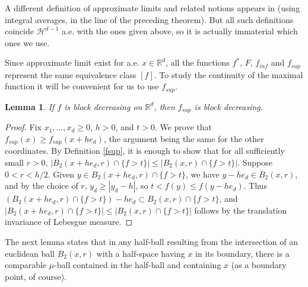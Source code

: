 \documentclass[12pt]{amsart}
\numberwithin{equation}{section}
\theoremstyle{plain}
\newtheorem{lemma}[theorem]{Lemma}
\theoremstyle{definition}
\theoremstyle{remark}
\begin{document}
A different  definition of approximate limits
and related notions appears
in \cite{AFP} (using integral averages, in the line of
the preceding theorem).
But all such definitions coincide
 $\mathcal{H}^{d-1}$ a.e. with the ones given above, so it is actually
 immaterial which ones we use.

Since approximate limit exist for a.e. $x\in
\mathbb{R}^d$,  all the functions $f^*$, $F$, $f_{inf}$ and
$f_{sup}$ represent the same equivalence class $[f]$. To study  the continuity of the maximal function it will be convenient for us to use
$f_{sup}$.

\begin{lemma}
  If $f$ is block decreasing on $\mathbb{R}^d$, then
  $f_{sup}$ is block decreasing.
\end{lemma}

\begin{proof}
 Fix $x_1,\ldots,x_d\ge 0$, $h>0$, and $t > 0$. We  prove that $f_{sup}(x)\ge
  f_{sup}(x+he_d)$, the argument being the same for the other coordinates.
  By Definition \ref{fsup}, it is enough to show that for all sufficiently
  small $r >0$, $|B_2(x+he_d,r)\cap\{f>t\}|\le| B_2(x,r)\cap\{f>t\}|$.
Suppose $0<r<h/2$. Given
$y\in B_2(x+he_d,r)\cap\{f>t\}$, we have $y - h e_d \in B_2(x,r)$, and by the choice of $r$,
$y_d\ge |y_d-h|$, so $t < f(y)\le f(y-he_d)$. Thus
$\left(B_2(x+he_d,r)\cap\{f>t\}\right) - h e_d \subset  B_2(x,r)\cap\{f>t\}$,
and $|B_2(x+he_d,r)\cap\{f>t\}|\le| B_2(x,r)\cap\{f>t\}|$ follows by the translation invariance of Lebesgue measure.
\end{proof}

The next lemma  states that in any half-ball resulting from the intersection of an euclidean ball
$B_2 (x,r)$ with a half-space having $x$ in its boundary, there is a
comparable $\mu$-ball contained in the half-ball and containing
$x$ (as a boundary point, of course).
\end{document}
